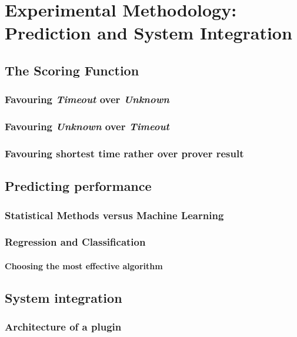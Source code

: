 \chapter{Experimental Methodology: Prediction and System Integration}
\label{Prediction}

\section{The Scoring Function}
\subsection{Favouring \textit{Timeout} over \textit{Unknown}}
\subsection{Favouring \textit{Unknown} over \textit{Timeout}}
\subsection{Favouring shortest time rather over prover result}


\section{Predicting performance}
\subsection{Statistical Methods versus Machine Learning}
\subsection{Regression and Classification}
\subsubsection{Choosing the most effective algorithm} 

\section{System integration}
\subsection{Architecture of a \why{} plugin}

